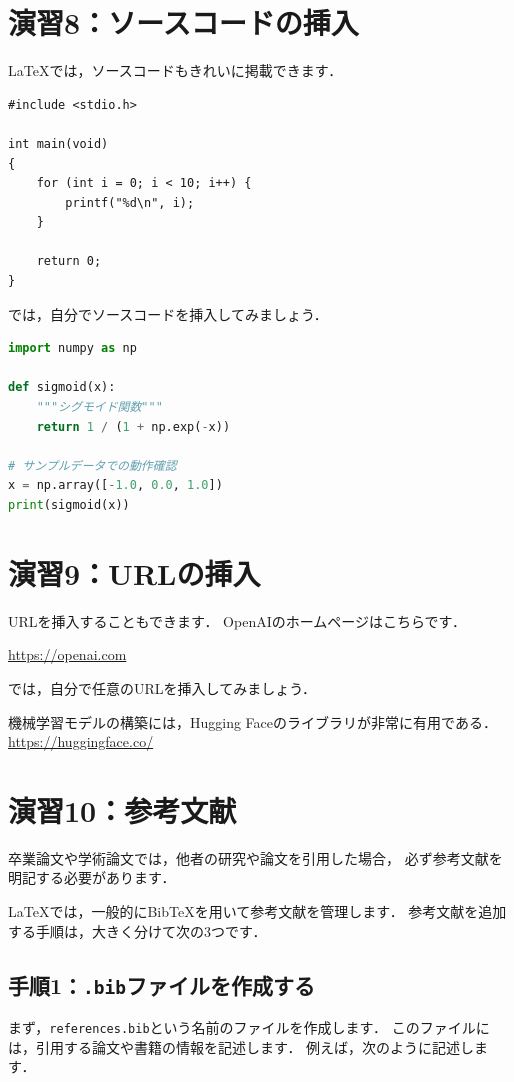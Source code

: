 \documentclass[a4paper,twocolumn]{jsarticle}
\begin{document}
\section*{演習8：ソースコードの挿入}
LaTeXでは，ソースコードもきれいに掲載できます．

\begin{lstlisting}
#include <stdio.h>

int main(void)
{
    for (int i = 0; i < 10; i++) {
        printf("%d\n", i);
    }

    return 0;
}
\end{lstlisting}

では，自分でソースコードを挿入してみましょう．

\begin{lstlisting}[language=Python]
import numpy as np

def sigmoid(x):
    """シグモイド関数"""
    return 1 / (1 + np.exp(-x))

# サンプルデータでの動作確認
x = np.array([-1.0, 0.0, 1.0])
print(sigmoid(x))
\end{lstlisting}

\section*{演習9：URLの挿入}
URLを挿入することもできます．
OpenAIのホームページはこちらです．

\url{https://openai.com}

では，自分で任意のURLを挿入してみましょう．

機械学習モデルの構築には，Hugging Faceのライブラリが非常に有用である．\\
\url{https://huggingface.co/}

\section*{演習10：参考文献}
卒業論文や学術論文では，他者の研究や論文を引用した場合，
必ず参考文献を明記する必要があります．

LaTeXでは，一般的にBibTeXを用いて参考文献を管理します．
参考文献を追加する手順は，大きく分けて次の3つです．

\subsection*{手順1：\texttt{.bib}ファイルを作成する}
まず，\texttt{references.bib}という名前のファイルを作成します．
このファイルには，引用する論文や書籍の情報を記述します．
例えば，次のように記述します．
\end{document}
